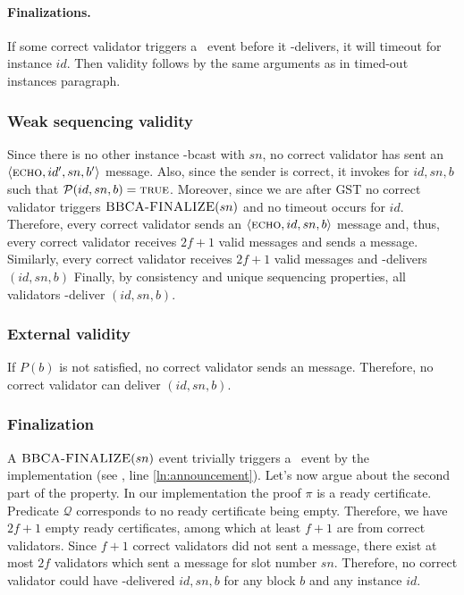 \paragraph{Finalizations.} If some correct validator triggers a \bbcaabort\ event before it \primitivesmall-delivers, it will timeout for instance $id$.
 Then validity follows by the same arguments as in timed-out instances paragraph.

\subsubsection{Weak sequencing validity}
\label{sec:bbca-weak-seq-validity}
Since there is no other instance \primitivesmall-bcast  with $sn$, no correct validator has sent an $\langle \textsc{echo}, id', sn, b'\rangle$ message.
Also, since the sender is correct, it invokes \bbcacast for $id,sn,b$ such that $\mathcal{P}(id,sn,b)=\textsc{true}$. 
Moreover, since we are after GST no correct validator triggers $\textsc{BBCA-FINALIZE}(sn)$ and no timeout occurs for $id$.
Therefore, every correct validator sends an $\langle \textsc{echo}, id, sn, b\rangle$ message and, thus, every correct validator receives $2f+1$  valid \echo messages and sends a \ready message.
Similarly, every correct validator receives $2f+1$ valid \ready messages and \primitivesmall-delivers $(id,sn,b)$ 
Finally, by consistency and unique sequencing properties, all validators \primitivesmall-deliver $(id,sn,b)$.

\subsubsection{External validity}
\label{sec:consistency}
If $P(b)$ is not satisfied, no correct validator sends an \echo message.
Therefore, no correct validator can deliver $(id,sn,b)$.

\subsubsection{Finalization}
\label{sec:bbca-finalization}
A $\textsc{BBCA-FINALIZE}(sn)$ event trivially triggers a \bbcaannounce\ event by the implementation (see , line \ref{ln:announcement}).
Let's now argue about the second part of the property.
In our implementation the proof $\pi$ is a ready certificate.
Predicate $\mathcal{Q}$ corresponds to no ready certificate being empty.
Therefore, we have $2f+1$ empty ready certificates, among which at least $f+1$ are from correct validators.
Since $f+1$ correct validators did not sent a \ready message, there exist at most $2f$ validators which sent a \ready message for slot number $sn$.
Therefore, no correct validator could have \primitivesmall-delivered $id, sn, b$ for any block $b$ and any instance $id$.


